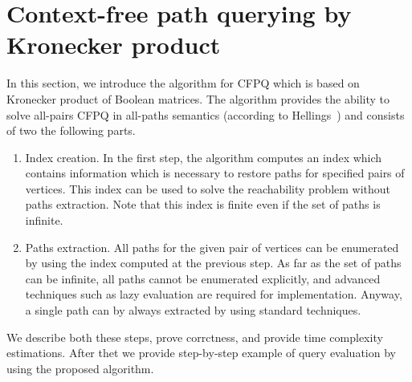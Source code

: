 \section{Context-free path querying by Kronecker product}


In this section, we introduce the algorithm for CFPQ which is based on Kronecker product of Boolean matrices. 
The algorithm provides the ability to solve all-pairs CFPQ in all-paths semantics (according to Hellings~\cite{!!!}) and consists of two the following parts. 
\begin{enumerate}
\item Index creation. In the first step, the algorithm computes an index which contains information which is necessary to restore paths for specified pairs of vertices. This index can be used to solve the reachability problem without paths extraction. Note that this index is finite even if the set of paths is infinite.
\item Paths extraction. All paths for the given pair of vertices can be enumerated by using the index computed at the previous step. As far as the set of paths can be infinite, all paths cannot be enumerated explicitly, and advanced techniques such as lazy evaluation are required for implementation. Anyway, a single path can by always extracted by using standard techniques.
\end{enumerate}

We describe both these steps, prove corrctness, and provide time complexity estimations. 
After thet we provide step-by-step example of query evaluation by using the proposed algorithm.



